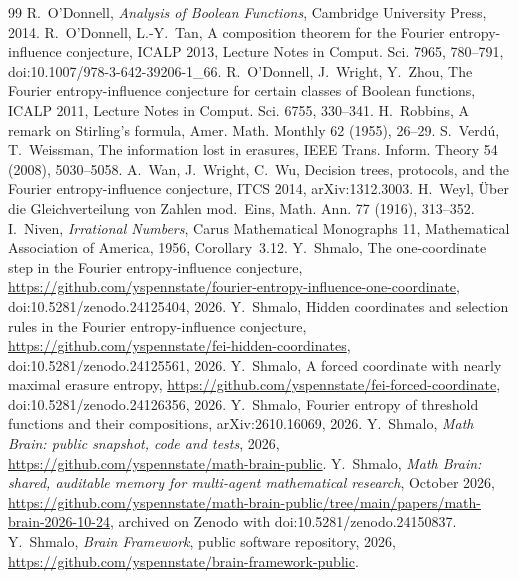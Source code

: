 \documentclass[11pt]{amsart}
\theoremstyle{remark}
\begin{document}
\begin{thebibliography}{99}
 R.~O'Donnell, \emph{Analysis of Boolean Functions}, Cambridge University Press, 2014.
 R.~O'Donnell, L.-Y.~Tan, A composition theorem for the Fourier entropy-influence conjecture, ICALP 2013,
Lecture Notes in Comput. Sci. 7965, 780--791, doi:10.1007/978-3-642-39206-1\_66.
 R.~O'Donnell, J.~Wright, Y.~Zhou, The Fourier entropy-influence conjecture for certain classes of
Boolean functions, ICALP 2011, Lecture Notes in Comput. Sci. 6755, 330--341.
 H.~Robbins, A remark on Stirling's formula, Amer. Math. Monthly 62 (1955), 26--29.
 S.~Verd\'u, T.~Weissman, The information lost in erasures, IEEE Trans. Inform. Theory 54 (2008),
5030--5058.
 A.~Wan, J.~Wright, C.~Wu, Decision trees, protocols, and the Fourier entropy-influence conjecture, ITCS 2014,
arXiv:1312.3003.
 H.~Weyl, \"Uber die Gleichverteilung von Zahlen mod.~Eins, Math. Ann. 77 (1916), 313--352.
 I.~Niven, \emph{Irrational Numbers}, Carus Mathematical Monographs 11, Mathematical Association of
America, 1956, Corollary~3.12.
 Y.~Shmalo, The one-coordinate step in the Fourier entropy-influence conjecture,
\url{https://github.com/yspennstate/fourier-entropy-influence-one-coordinate}, doi:10.5281/zenodo.24125404, 2026.
 Y.~Shmalo, Hidden coordinates and selection rules in the Fourier entropy-influence conjecture,
\url{https://github.com/yspennstate/fei-hidden-coordinates}, doi:10.5281/zenodo.24125561, 2026.
 Y.~Shmalo, A forced coordinate with nearly maximal erasure entropy,
\url{https://github.com/yspennstate/fei-forced-coordinate}, doi:10.5281/zenodo.24126356, 2026.
 Y.~Shmalo, Fourier entropy of threshold functions and their compositions,
arXiv:2610.16069, 2026.
 Y.~Shmalo, \emph{Math Brain: public snapshot, code and tests}, 2026,
\url{https://github.com/yspennstate/math-brain-public}.
 Y.~Shmalo, \emph{Math Brain: shared, auditable memory for multi-agent mathematical research},
October 2026, \url{https://github.com/yspennstate/math-brain-public/tree/main/papers/math-brain-2026-10-24}, archived on Zenodo with doi:10.5281/zenodo.24150837.
 Y.~Shmalo, \emph{Brain Framework}, public software repository, 2026,
\url{https://github.com/yspennstate/brain-framework-public}.
\end{thebibliography}
\end{document}
